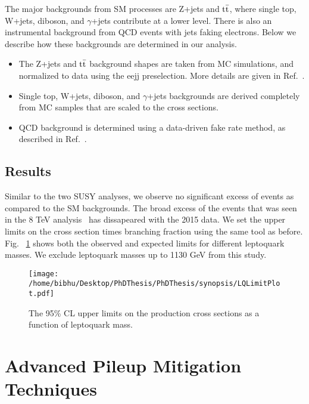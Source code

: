 The major backgrounds from SM processes are Z+jets and $\rm t\bar{t}$, where single top,
 W+jets, diboson, and $\gamma$+jets contribute at a lower level. There is also an instrumental background from QCD events with jets faking electrons. Below we describe how these
backgrounds are determined in our analysis.
\begin{itemize}
\item The Z+jets and $\rm t\bar{t}$ background shapes are taken from MC simulations, and normalized
 to data using the eejj preselection. More details are given in Ref.~\cite{CMS-PAS-EXO-16-043}.
\item Single top, W+jets, diboson, and $\gamma$+jets backgrounds are derived completely from
 MC samples that are scaled to the cross sections.
 \item QCD background is determined using a data-driven fake rate method, as
 described in Ref.~\cite{CMS-PAS-EXO-16-043}.

\end{itemize}




\subsection{Results}
Similar to the two SUSY analyses, we observe no significant excess of events as compared to the SM backgrounds. The broad excess of the events that was seen in the 8 TeV analysis~\cite{CMS-PAS-EXO-12-041} has dissapeared with the 2015 data. We set the upper limits on the cross section times branching fraction using the same tool as before. Fig. ~\ref{figure:LimitLQ12016Synop} shows both the observed and expected limits for different leptoquark masses. We exclude leptoquark masses up to 1130 GeV from this study. 

\begin{figure}[h]
\centering
\texttt{[image: /home/bibhu/Desktop/PhDThesis/PhDThesis/synopsis/LQLimitPlot.pdf]}

\caption{\label{figure:LimitLQ12016Synop}The 95\% CL upper limits on the production cross sections as a function of leptoquark mass.}
\end{figure}



\section{Advanced Pileup Mitigation Techniques}

